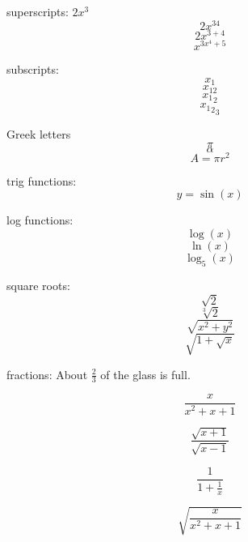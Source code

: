 \documentclass[11pt]{article}
\begin{document}
superscripts: $2x^3$
$$2x^{34}$$
$$2x^{3+4}$$
$$x^{3x^4+5}$$

subscripts:
$$x_1$$
$$x_{12}$$
$${x_1}_2$$
$${{x_1}_2}_3$$

Greek letters
$$\pi$$
$$\alpha$$
$$A=\pi r^2$$

trig functions:
$$y=\sin(x)$$

log functions:
$$\log(x)$$
$$\ln(x)$$
$$\log_5(x)$$

square roots:
$$\sqrt{2}$$
$$\sqrt[3]{2}$$
$$\sqrt{x^2+y^2}$$
$$\sqrt{1+\sqrt{x}}$$

fractions:
About $\displaystyle{\frac{2}{3}}$ of the glass is full.

$$\frac{x}{x^2+x+1}$$

$$\frac{\sqrt{x+1}}{\sqrt{x-1}}$$

$$\frac{1}{1+\frac{1}{x}}$$

$$\sqrt{\frac{x}{x^2+x+1}}$$
\end{document}
